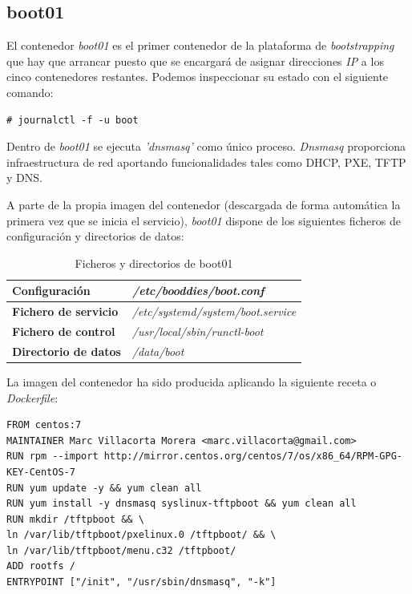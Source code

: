 \documentclass[a4paper,12pt,spanish,final]{epsc_tfc_pfc}
\begin{document}
\subsection{boot01}

El contenedor \emph{boot01} es el primer contenedor de la plataforma de \emph{bootstrapping} que hay que arrancar puesto que se encargará de asignar direcciones \emph{IP} a los cinco contenedores restantes.
Podemos inspeccionar su estado con el siguiente comando:\\

\begin{lstlisting}[style=dnsmasq]
# journalctl -f -u boot
\end{lstlisting}

Dentro de \emph{boot01} se ejecuta \emph{'dnsmasq'} como único proceso. \emph{Dnsmasq} proporciona infraestructura de red aportando funcionalidades tales como DHCP, PXE, TFTP y DNS.

A parte de la propia imagen del contenedor (descargada de forma automática la primera vez que se inicia el servicio), \emph{boot01} dispone de los siguientes ficheros de configuración y directorios de datos:

\begin{table}[h]

  \centering

  \begin{tabular}{ll}
    \toprule
    \textbf{Configuración}        & \textit{/etc/booddies/boot.conf}          \\
    \midrule
    \rowcolor[HTML]{EFEFEF}
    \textbf{Fichero de servicio}  & \textit{/etc/systemd/system/boot.service} \\
    \midrule
    \textbf{Fichero de control}   & \textit{/usr/local/sbin/runctl-boot}      \\
    \midrule
    \rowcolor[HTML]{EFEFEF}
    \textbf{Directorio de datos}  & \textit{/data/boot}                       \\
    \bottomrule
  \end{tabular}

  \caption{Ficheros y directorios de boot01}

\end{table}

La imagen del contenedor ha sido producida aplicando la siguiente receta o \emph{Dockerfile}:\\

\begin{lstlisting}[style=dnsmasq]
FROM centos:7
MAINTAINER Marc Villacorta Morera <marc.villacorta@gmail.com>
RUN rpm --import http://mirror.centos.org/centos/7/os/x86_64/RPM-GPG-KEY-CentOS-7
RUN yum update -y && yum clean all
RUN yum install -y dnsmasq syslinux-tftpboot && yum clean all
RUN mkdir /tftpboot && \
ln /var/lib/tftpboot/pxelinux.0 /tftpboot/ && \
ln /var/lib/tftpboot/menu.c32 /tftpboot/
ADD rootfs /
ENTRYPOINT ["/init", "/usr/sbin/dnsmasq", "-k"]
\end{lstlisting}
\end{document}
